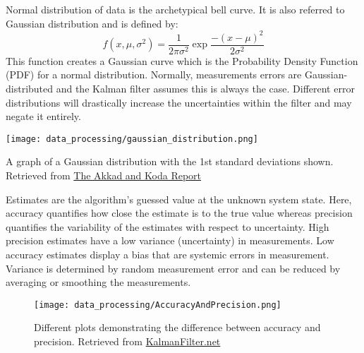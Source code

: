         \begin{kaobox}[frametitle=Aside: Normal Distribution]
            Normal distribution of data is the archetypical bell curve.
            It is also referred to Gaussian distribution and is defined by:
            \begin{equation*}
                f(x, \mu, \sigma^2) = \frac{1}{2\pi\sigma^2} \exp{\frac{-(x-\mu)^2}{2\sigma^2}}
            \end{equation*}
            This function creates a Gaussian curve which is the Probability Density Function (PDF) for a normal distribution.
            Normally, measurements errors are Gaussian-distributed and the Kalman filter assumes this is always the case.
            Different error distributions will drastically increase the uncertainties within the filter and may negate it entirely.
        \end{kaobox}
        
        \begin{marginfigure}[-2in]
            \texttt{[image: data\_processing/gaussian\_distribution.png]}
            \caption[Aside: Gaussian Distribution]{A graph of a Gaussian distribution with the 1st standard deviations shown.
            Retrieved from \href{https://accadandkoka.com/blog/how-normal-is-the-normal-distribution/}{The Akkad and Koda Report}}
        \end{marginfigure}

        Estimates are the algorithm's guessed value at the unknown system state.
        Here, accuracy quantifies how close the estimate is to the true value whereas precision quantifies the variability of the estimates with respect to uncertainty.
        High precision estimates have a low variance (uncertainty) in measurements.
        Low accuracy estimates display a bias that are systemic errors in measurement.
        Variance is determined by random measurement error and can be reduced by averaging or smoothing the measurements.

        \begin{figure*}[h!]
            \texttt{[image: data\_processing/AccuracyAndPrecision.png]}
            \caption[Accuracy and Precision]{Different plots demonstrating the difference between accuracy and precision.
            Retrieved from \href{https://www.kalmanfilter.net/img/BB1/AccuracyAndPrecision.png}{KalmanFilter.net}}
        \end{figure*}

